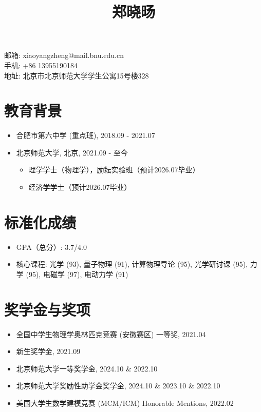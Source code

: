 \documentclass{article}
\title{郑晓旸}
\date{}
\begin{document}
\maketitle
\begin{center}
    邮箱: xiaoyangzheng@mail.bnu.edu.cn \\
    手机: +86 13955190184 \\
    地址: 北京市北京师范大学学生公寓15号楼328
\end{center}

\section*{教育背景}
\begin{itemize}
    \item 合肥市第六中学 (重点班), 2018.09 - 2021.07
    \item 北京师范大学, 北京, 2021.09 - 至今
    \begin{itemize}
        \item 理学学士（物理学），励耘实验班（预计2026.07毕业）
        \item 经济学学士（预计2026.07毕业）
    \end{itemize}
\end{itemize}

\section*{标准化成绩}
\begin{itemize}
    \item GPA（总分）: 3.7/4.0
    \item 核心课程: 光学 (93), 量子物理 (91), 计算物理导论 (95), 光学研讨课 (95), 力学 (95), 电磁学 (97), 电动力学 (91)
\end{itemize}

\section*{奖学金与奖项}
\begin{itemize}
    \item 全国中学生物理学奥林匹克竞赛 (安徽赛区) 一等奖, 2021.04
    \item 新生奖学金, 2021.09
    \item 北京师范大学一等奖学金, 2024.10 \& 2022.10
    \item 北京师范大学奖励性助学金奖学金, 2024.10 \& 2023.10 \& 2022.10
    \item 美国大学生数学建模竞赛 (MCM/ICM) Honorable Mentions, 2022.02
\end{itemize}
\end{document}
